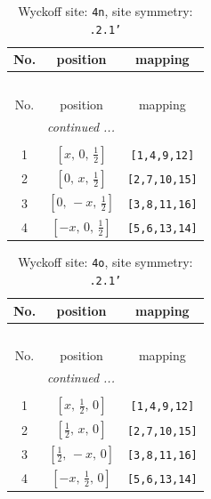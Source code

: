\documentclass[fleqn,8pt]{jsarticle}
\begin{document}
\renewcommand{\arraystretch}{1.2}
\begin{longtable}{ccc}
\caption{Wyckoff site: {\tt 4n}, site symmetry: {\tt .2.1'}}
 \\
 \hline \hline
No. & position & mapping \\ \hline \endfirsthead

\multicolumn{2}{l}{\tablename\ \thetable{}} \\
 \hline \hline
No. & position & mapping \\ \hline \endhead

 \hline \hline
\multicolumn{2}{r}{\footnotesize\it continued ...} \\ \endfoot

 \hline \hline
\multicolumn{2}{r}{} \\ \endlastfoot

1 & $\left[ x,\, 0,\, \frac{1}{2} \right]$ & {\tt [1,4,9,12]} \\ \hline
2 & $\left[ 0,\, x,\, \frac{1}{2} \right]$ & {\tt [2,7,10,15]} \\ \hline
3 & $\left[ 0,\, - x,\, \frac{1}{2} \right]$ & {\tt [3,8,11,16]} \\ \hline
4 & $\left[ - x,\, 0,\, \frac{1}{2} \right]$ & {\tt [5,6,13,14]} \\
\end{longtable}
\renewcommand{\arraystretch}{1.2}
\begin{longtable}{ccc}
\caption{Wyckoff site: {\tt 4o}, site symmetry: {\tt .2.1'}}
 \\
 \hline \hline
No. & position & mapping \\ \hline \endfirsthead

\multicolumn{2}{l}{\tablename\ \thetable{}} \\
 \hline \hline
No. & position & mapping \\ \hline \endhead

 \hline \hline
\multicolumn{2}{r}{\footnotesize\it continued ...} \\ \endfoot

 \hline \hline
\multicolumn{2}{r}{} \\ \endlastfoot

1 & $\left[ x,\, \frac{1}{2},\, 0 \right]$ & {\tt [1,4,9,12]} \\ \hline
2 & $\left[ \frac{1}{2},\, x,\, 0 \right]$ & {\tt [2,7,10,15]} \\ \hline
3 & $\left[ \frac{1}{2},\, - x,\, 0 \right]$ & {\tt [3,8,11,16]} \\ \hline
4 & $\left[ - x,\, \frac{1}{2},\, 0 \right]$ & {\tt [5,6,13,14]} \\
\end{longtable}
\end{document}
